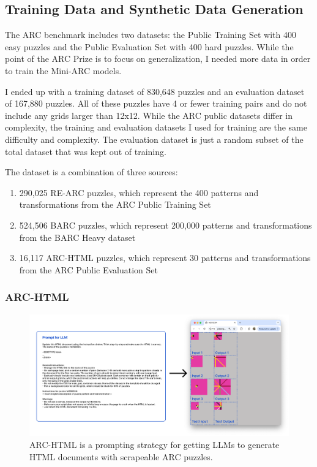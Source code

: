 \documentclass[10pt,twocolumn]{article}
\begin{document}
\subsection{Training Data and Synthetic Data Generation}

The ARC benchmark includes two datasets: the Public Training Set with
400 easy puzzles and the Public Evaluation Set with 400 hard puzzles.
While the point of the ARC Prize is to focus on generalization, I
needed more data in order to train the Mini-ARC models.

I ended up with a training dataset of 830,648 puzzles and an
evaluation dataset of 167,880 puzzles. All of these puzzles have 4 or
fewer training pairs and do not include any grids larger than 12x12.
While the ARC public datasets differ in complexity, the training and
evaluation datasets I used for
training are the same difficulty and complexity. The evaluation
dataset is just a random subset of the total dataset that was kept
out of training.

The dataset is a combination of three sources:
\begin{enumerate}
  \item 290,025 RE-ARC puzzles, which represent the 400 patterns and
    transformations from the ARC Public Training Set
  \item 524,506 BARC puzzles, which represent 200,000 patterns and
    transformations from the BARC Heavy dataset
  \item 16,117 ARC-HTML puzzles, which represent 30 patterns and
    transformations from the ARC Public Evaluation Set
\end{enumerate}

\subsubsection{ARC-HTML}

\begin{figure}[h!]
  \centering
  \includegraphics[width=\textwidth]{figures/prompt.png}
  \caption{ARC-HTML is a prompting strategy for getting LLMs to
  generate HTML documents with scrapeable ARC puzzles.}
  \label{fig:top-image}
\end{figure}
\end{document}
